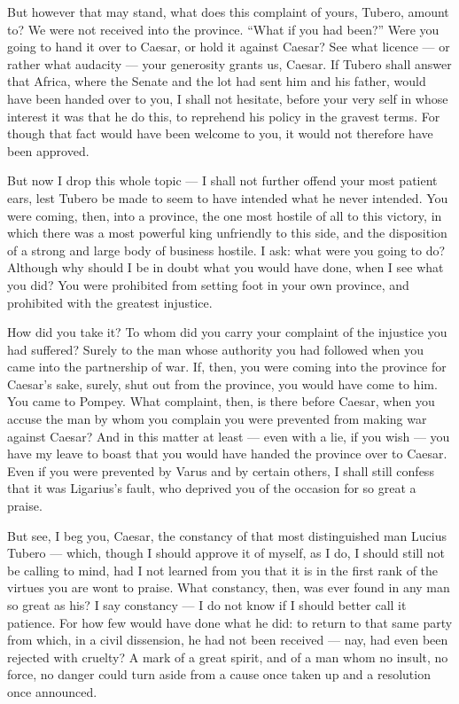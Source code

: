  But however that may stand, what does this complaint of yours, Tubero, amount to? We were not received into the province. ``What if you had been?'' Were you going to hand it over to Caesar, or hold it against Caesar? See what licence --- or rather what audacity --- your generosity grants us, Caesar. If Tubero shall answer that Africa, where the Senate and the lot had sent him and his father, would have been handed over to you, I shall not hesitate, before your very self in whose interest it was that he do this, to reprehend his policy in the gravest terms. For though that fact would have been welcome to you, it would not therefore have been approved.

 But now I drop this whole topic --- I shall not further offend your most patient ears, lest Tubero be made to seem to have intended what he never intended. You were coming, then, into a province, the one most hostile of all to this victory, in which there was a most powerful king unfriendly to this side, and the disposition of a strong and large body of business hostile. I ask: what were you going to do? Although why should I be in doubt what you would have done, when I see what you did? You were prohibited from setting foot in your own province, and prohibited with the greatest injustice.

 How did you take it? To whom did you carry your complaint of the injustice you had suffered? Surely to the man whose authority you had followed when you came into the partnership of war. If, then, you were coming into the province for Caesar's sake, surely, shut out from the province, you would have come to him. You came to Pompey. What complaint, then, is there before Caesar, when you accuse the man by whom you complain you were prevented from making war against Caesar? And in this matter at least --- even with a lie, if you wish --- you have my leave to boast that you would have handed the province over to Caesar. Even if you were prevented by Varus and by certain others, I shall still confess that it was Ligarius's fault, who deprived you of the occasion for so great a praise.

 But see, I beg you, Caesar, the constancy of that most distinguished man Lucius Tubero --- which, though I should approve it of myself, as I do, I should still not be calling to mind, had I not learned from you that it is in the first rank of the virtues you are wont to praise. What constancy, then, was ever found in any man so great as his? I say constancy --- I do not know if I should better call it patience. For how few would have done what he did: to return to that same party from which, in a civil dissension, he had not been received --- nay, had even been rejected with cruelty? A mark of a great spirit, and of a man whom no insult, no force, no danger could turn aside from a cause once taken up and a resolution once announced.

